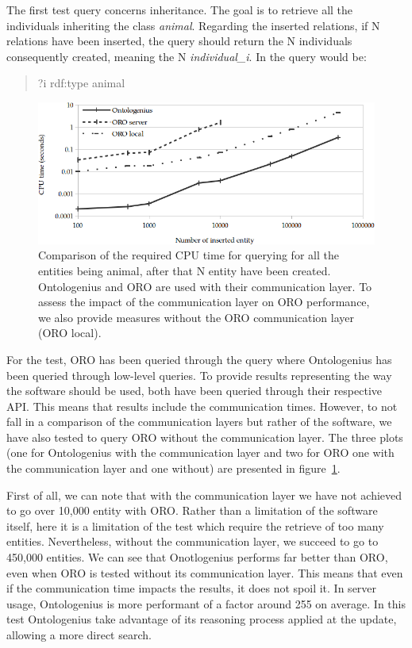 The first test query concerns inheritance. The goal is to retrieve all the individuals inheriting the class \textit{animal}. Regarding the inserted relations, if N relations have been inserted, the query should return the N individuals consequently created, meaning the N \textit{individual\_i}. In \sparql{} the query would be:

\begin{quote} 
\centering 
?i rdf:type animal
\end{quote}

\begin{figure}[ht!]
\centering
\includegraphics[width=\textwidth]{figures/chapter2/oro/R1.png}
\caption{\label{fig:chap2_oro_r1}Comparison of the required CPU time for querying for all the entities being animal, after that N entity have been created. Ontologenius and ORO are used with their communication layer. To assess the impact of the communication layer on ORO performance, we also provide measures without the ORO communication layer (ORO local).}
\end{figure}

For the test, ORO has been queried through the \sparql{} query where Ontologenius has been queried through low-level queries. To provide results representing the way the software should be used, both have been queried through their respective API. This means that results include the communication times. However, to not fall in a comparison of the communication layers but rather of the software, we have also tested to query ORO without the communication layer. The three plots (one for Ontologenius with the communication layer and two for ORO one with the communication layer and one without) are presented in figure~\ref{fig:chap2_oro_r1}.

First of all, we can note that with the communication layer we have not achieved to go over 10,000 entity with ORO. Rather than a limitation of the software itself, here it is a limitation of the test which require the retrieve of too many entities. Nevertheless, without the communication layer, we succeed to go to 450,000 entities. We can see that Onotlogenius performs far better than ORO, even when ORO is tested without its communication layer. This means that even if the communication time impacts the results, it does not spoil it. In server usage, Ontologenius is more performant of a factor around 255 on average. In this test Ontologenius take advantage of its reasoning process applied at the update, allowing a more direct search.

